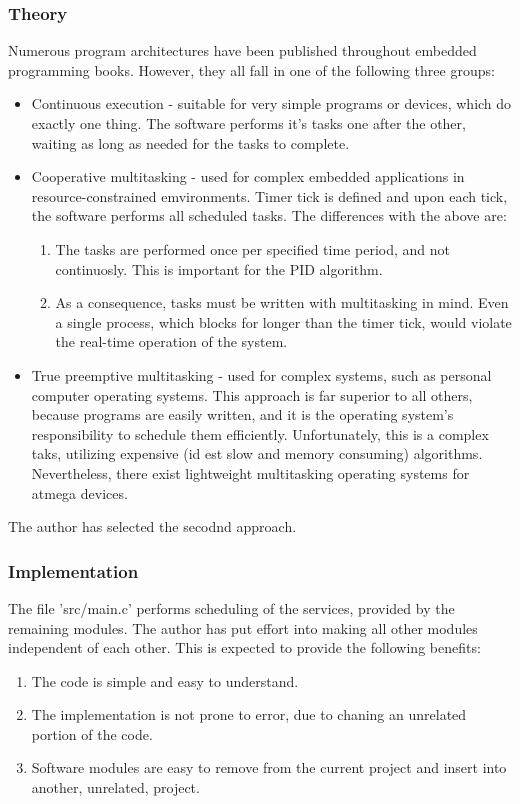 \subsubsection{Theory}
Numerous program architectures have been published throughout embedded programming books.
However, they all fall in one of the following three groups:
\begin{itemize}
\item{Continuous execution - suitable for very simple programs or devices, which do exactly one thing.
The software performs it's tasks one after the other, waiting as long as needed for the tasks to complete.}
\item{Cooperative multitasking - used for complex embedded applications in resource-constrained emvironments.
Timer tick is defined and upon each tick, the software performs all scheduled tasks.
The differences with the above are:}
\begin{enumerate}
\item{The tasks are performed once per specified time period, and not continuosly.
This is important for the PID algorithm.}
\item{As a consequence, tasks must be written with multitasking in mind.
Even a single process, which blocks for longer than the timer tick, would violate the real-time operation of the system.}
\end{enumerate}
\item{True preemptive multitasking - used for complex systems, such as personal computer operating systems.
This approach is far superior to all others, because programs are easily written, and it is the operating system's responsibility to schedule them efficiently.
Unfortunately, this is a complex taks, utilizing expensive (id est slow and memory consuming) algorithms.
Nevertheless, there exist lightweight multitasking operating systems for atmega devices.}
\end{itemize}
The author has selected the secodnd approach.

\subsubsection{Implementation}
The file 'src/main.c' performs scheduling of the services, provided by the remaining modules.
The author has put effort into making all other modules independent of each other.
This is expected to provide the following benefits:
\begin{enumerate}
\item{The code is simple and easy to understand.}
\item{The implementation is not prone to error, due to chaning an unrelated portion of the code.}
\item{Software modules are easy to remove from the current project and insert into another, unrelated, project.}
\end{enumerate}

